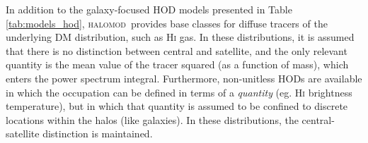 \documentclass[5p,aas_macros]{elsarticle}
\newcommand{\halomod}{\textsc{halomod}\xspace} %
\begin{document}
In addition to the galaxy-focused HOD models presented in Table \ref{tab:models_hod}, \halomod\ provides base classes for diffuse tracers of the underlying DM distribution, such as H\textsc{i} gas. 
In these distributions, it is assumed that there is no distinction between central and satellite, and the only relevant quantity is the mean value of the tracer squared (as a function of mass), which enters the power spectrum integral. 
Furthermore, non-unitless HODs are available in which the occupation can be defined in terms of a \textit{quantity} (eg. H\textsc{i} brightness temperature), but in which that quantity is assumed to be confined to discrete locations within the halos (like galaxies). In these distributions, the central-satellite distinction is maintained.


\end{document}
